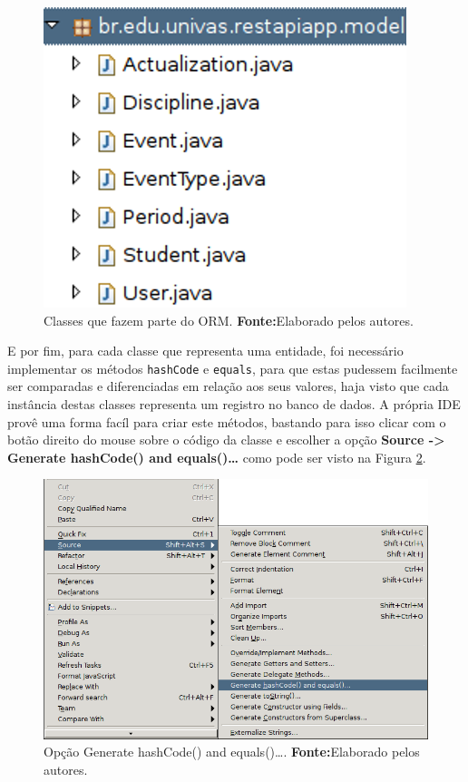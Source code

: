 	
	\begin{figure}[h!]
		\centerline{\includegraphics[scale=0.8]{./imagens/2_q_metodologico/4_procedimentos_resultados/43_webservice/432_desenvolvimento/desws12.png}}
		\caption[Classes que fazem parte do ORM]{Classes que fazem parte do ORM.
			\textbf{Fonte:}Elaborado pelos autores.}
		\label{fig:desws12}
	\end{figure}
	
	\pagebreak

	\par E por fim, para cada classe que representa uma entidade, foi necessário
implementar os métodos \texttt{hashCode} e \texttt{equals}, para que estas
pudessem facilmente ser comparadas e diferenciadas em relação aos seus
valores, haja visto que cada instância destas classes representa um registro
no banco de dados. A própria IDE provê uma forma facíl para criar este métodos,
bastando para isso clicar com o botão direito do mouse sobre o código da classe
e escolher a opção \textbf{Source -> Generate hashCode() and equals()\ldots}
como pode ser visto na Figura \ref{fig:desws13}.

	\begin{figure}[h!]
		\centerline{\includegraphics[scale=0.8]{./imagens/2_q_metodologico/4_procedimentos_resultados/43_webservice/432_desenvolvimento/desws13.png}}
		\caption[Opção Generate hashCode() and equals()\ldots]{Opção Generate
		hashCode() and equals()\ldots .
			\textbf{Fonte:}Elaborado pelos autores.}
		\label{fig:desws13}
	\end{figure}
	
